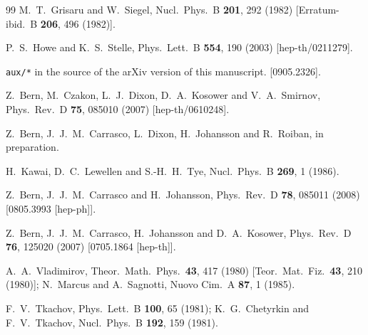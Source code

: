 \documentclass[aps,prl,twocolumn,groupedaddress,draft,showpacs,nofootinbib]{revtex4}
\begin{document}
\begin{thebibliography}{99}
M.~T.~Grisaru and W.~Siegel,
Nucl.\ Phys.\  B {\bf 201}, 292 (1982)
[Erratum-ibid.\  B {\bf 206}, 496 (1982)].

P.~S.~Howe and K.~S.~Stelle,
Phys.\ Lett.\ B {\bf 554}, 190 (2003)
[hep-th/0211279].

{\tt aux/*} in the source of the arXiv version of this manuscript.
[0905.2326].  

Z.~Bern, M.~Czakon, L.~J.~Dixon, D.~A.~Kosower and V.~A.~Smirnov,
Phys.\ Rev.\  D {\bf 75}, 085010 (2007)
[hep-th/0610248].

Z.~Bern, J.~J.~M.~Carrasco, L.~Dixon, H.~Johansson and R.~Roiban,
in preparation.

H.~Kawai, D.~C.~Lewellen and S.-H.~H.~Tye,
Nucl.\ Phys.\ B {\bf 269}, 1 (1986).

Z.~Bern, J.~J.~M.~Carrasco and H.~Johansson,
Phys.\ Rev.\  D {\bf 78}, 085011 (2008)
[0805.3993 [hep-ph]].

Z.~Bern, J.~J.~M.~Carrasco, H.~Johansson and D.~A.~Kosower,
Phys.\ Rev.\  D {\bf 76}, 125020 (2007)
[0705.1864 [hep-th]].

A.~A.~Vladimirov,
Theor.\ Math.\ Phys.\  {\bf 43}, 417 (1980)
[Teor.\ Mat.\ Fiz.\  {\bf 43}, 210 (1980)];
%
N.~Marcus and A.~Sagnotti,
Nuovo Cim.\  A {\bf 87}, 1 (1985).

F.~V.~Tkachov,
Phys.\ Lett.\ B {\bf 100}, 65 (1981);
%
K.~G.~Chetyrkin and F.~V.~Tkachov,
Nucl.\ Phys.\ B {\bf 192}, 159 (1981).

\end{thebibliography}
\end{document}
